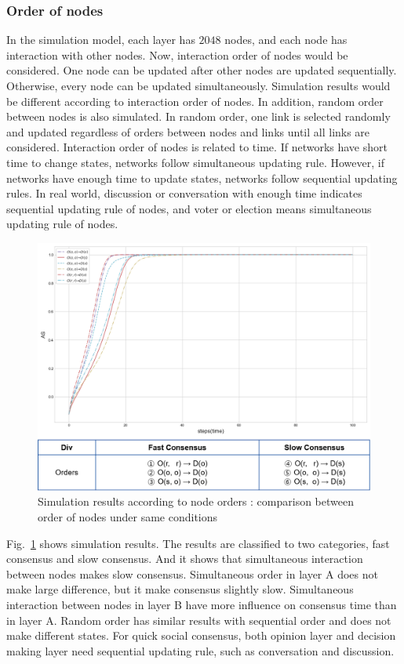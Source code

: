 \documentclass[review]{elsarticle}
\begin{document}
\subsubsection{Order of nodes}
In the simulation model, each layer has $2048$ nodes, and each node has interaction with other nodes. Now, interaction order of nodes would be considered. One node can be updated after other nodes are updated sequentially. Otherwise, every node can be updated simultaneously. Simulation results would be different according to interaction order of nodes. In addition, random order between nodes is also simulated. In random order, one link is selected randomly and updated regardless of orders between nodes and links until all links are considered. Interaction order of nodes is related to time. If networks have short time to change states, networks follow simultaneous updating rule. However, if networks have enough time to update states, networks follow sequential updating rules. In real world, discussion or conversation with enough time indicates sequential updating rule of nodes, and voter or election means simultaneous updating rule of nodes. 

\begin{figure}[!htb]
	\centering
	\includegraphics[width=\hsize]{nodeorder.png}
	\caption{Simulation results according to node orders : comparison between order of nodes under same conditions}
	\label{nodeorder}
\end{figure}
Fig.~\ref{nodeorder} shows simulation results. The results are classified to two categories, fast consensus and slow consensus. And it shows that simultaneous interaction between nodes makes slow consensus. Simultaneous order in layer A does not make large difference, but it make consensus slightly slow. Simultaneous interaction between nodes in layer B have more influence on consensus time than in layer A. Random order has similar results with sequential order and does not make different states. For quick social consensus, both opinion layer and decision making layer need sequential updating rule, such as conversation and discussion.      
\end{document}
